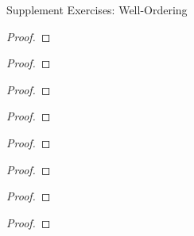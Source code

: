 \begin{section*}{Supplement Exercises: Well-Ordering}
    \begin{exercise}\label{chapter1:sectionX:exercise1}
    \end{exercise}

    \begin{proof}
    \end{proof}

    \begin{exercise}\label{chapter1:sectionX:exercise2}
    \end{exercise}

    \begin{proof}
    \end{proof}

    \begin{exercise}\label{chapter1:sectionX:exercise3}
    \end{exercise}

    \begin{proof}
    \end{proof}

    \begin{exercise}\label{chapter1:sectionX:exercise4}
    \end{exercise}

    \begin{proof}
    \end{proof}

    \begin{exercise}\label{chapter1:sectionX:exercise5}
    \end{exercise}

    \begin{proof}
    \end{proof}

    \begin{exercise}\label{chapter1:sectionX:exercise6}
    \end{exercise}

    \begin{proof}
    \end{proof}

    \begin{exercise}\label{chapter1:sectionX:exercise7}
    \end{exercise}

    \begin{proof}
    \end{proof}

    \begin{exercise}\label{chapter1:sectionX:exercise8}
    \end{exercise}

    \begin{proof}
    \end{proof}

\end{section*}
